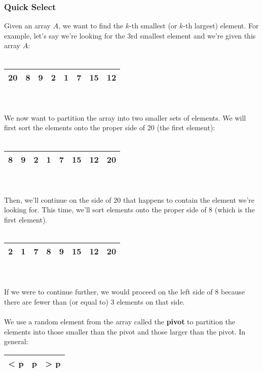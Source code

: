 \documentclass[]{article}
\theoremstyle{definition}
\begin{document}
			\subsubsection{Quick Select}
				Given an array $A$, we want to find the $k$-th smallest (or $k$-th largest) element. For example, let's say we're looking for the 3rd smallest element and we're given this array $A$: \\ \\
				\begin{tabular}{|c|c|c|c|c|c|c|c|}
					\hline 20 & 8 & 9 & 2 & 1 & 7 & 15 & 12 \\ \hline
				\end{tabular}
				\\ \\
				We now want to partition the array into two smaller sets of elements. We will first sort the elements onto the proper side of 20 (the first element):
				\\ \\
				\begin{tabular}{|c|c|c|c|c|c|c|c|}
					\hline 8 & 9 & 2 & 1 & 7 & 15 & 12 & 20 \\ \hline
				\end{tabular}
				\\ \\
				Then, we'll continue on the side of 20 that happens to contain the element we're looking for. This time, we'll sort elements onto the proper side of 8 (which is the first element).
				\\ \\
				\begin{tabular}{|c|c|c|c|c|c|c|c|}
					\hline 2 & 1 & 7 & 8 & 9 & 15 & 12 & 20 \\ \hline
				\end{tabular}
				\\ \\
				If we were to continue further, we would proceed on the left side of 8 because there are fewer than (or equal to) 3 elements on that side.
				\\ \\
				We use a random element from the array called the \textbf{pivot} to partition the elements into those smaller than the pivot and those larger than the pivot. In general:
				\begin{tabular}{|c|c|c|}
					\hline < p & p & > p \\ \hline
				\end{tabular}
				\\ \\
\end{document}
